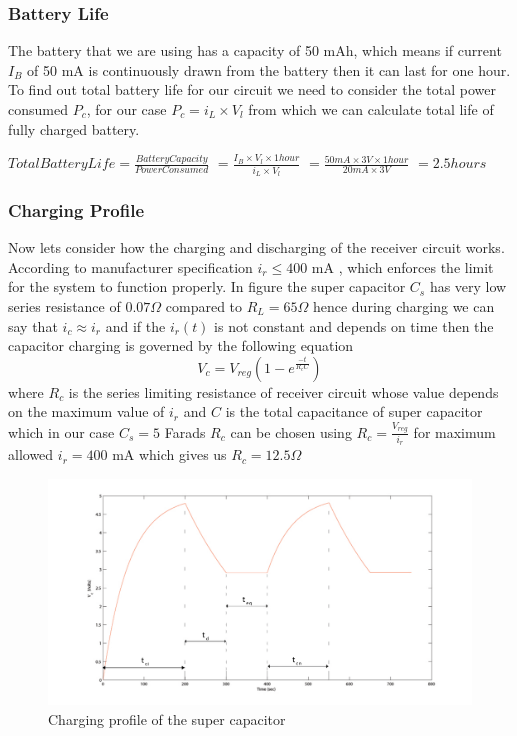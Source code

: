 \subsubsection{Battery Life}
The battery that we are using has a capacity of 50 mAh, which means if current $I_B$ of 50 mA  is continuously drawn from the battery then it can last for one hour. To find out total battery life for our circuit we need to consider the total power consumed $P_c$, for our case $P_c = i_L \times V_l $ from which we can calculate total life of fully charged battery.

 $Total Battery Life = \frac{Battery Capacity}{Power Consumed}$
                    $= \frac{I_B \times V_l \times 1 hour}{i_L \times V_l}$
                    $= \frac{50mA \times 3V \times 1 hour}{20mA \times 3V}$
                    $= 2.5 hours$


\subsubsection{Charging Profile}
Now lets consider how the charging and discharging of the receiver circuit works. According to manufacturer specification $i_r \leq 400 $ mA , which enforces the limit for the system to function properly.
In figure %
the super capacitor $C_s$ has very low series resistance of $0.07 \Omega$ compared to $R_L = 65 \Omega$ hence during charging we can say that $i_c \approx i_r$ and if the $i_r(t)$ is not constant and depends on time then the capacitor charging is governed by the following equation
\begin{equation}\label{eq:cap}
 V_c = V_{reg} \left(1 - e^{\frac{-t}{R_cC}}\right)
\end{equation}
where $R_c$ is the series limiting resistance of receiver circuit whose value depends on the maximum value of $i_r$ and $C$ is the total capacitance of super capacitor which in our case $C_s = 5 $ Farads
$R_c$ can be chosen using $R_c = \frac { V_{reg}}{i_r} $ for maximum allowed $i_r = 400$ mA which gives us $R_c = 12.5 \Omega$

\begin{figure}[h!]
\centering
\includegraphics[width=1\textwidth]{cd_cycle.pdf}
\caption{Charging profile of the super capacitor }
\label{fig:ch_profile}
\end{figure}



